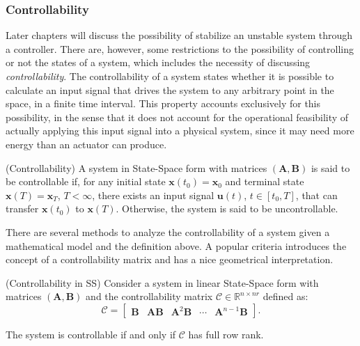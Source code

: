 \documentclass[a4paper,11pt]{book}
\numberwithin{figure}{chapter}
\numberwithin{equation}{chapter}
\numberwithin{table}{chapter}
\newtheorem{theorem}{Theorem}[chapter]
\theoremstyle{definition}
\newtheorem{definition}{Definition}[chapter]
\newcounter{boxed-theorem}
\newenvironment{boxed-theorem}[1]
{\colorlet{shadecolor}{pastelBlue2!10} \begin{shaded} \begin{theorem}{#1}}
{\end{theorem} \end{shaded}}
\newcounter{boxed-definition}
\newenvironment{boxed-definition}[1]
{\colorlet{shadecolor}{pastelYellow!15} \begin{shaded} \begin{definition}{#1}}
{\end{definition} \end{shaded}}
\newcounter{boxed-example}
\begin{document}
\subsubsection{Controllability}

Later chapters will discuss the possibility of stabilize an unstable system through a controller. There are, however, some restrictions to the possibility of controlling or not the states of a system, which includes the necessity of discussing \textit{controllability}. The controllability of a system states whether it is possible to calculate an input signal that drives the system to any arbitrary point in the space, in a finite time interval. This property accounts exclusively for this possibility, in the sense that it does not account for the operational feasibility of actually applying this input signal into a physical system, since it may need more energy than an actuator can produce. 

\begin{boxed-definition}{(Controllability)}
    A system in State-Space form with matrices $(\bm{A}, \bm{B})$ is said to be controllable if, for any initial state $\bm{x}(t_0) = \bm{x}_0$ and terminal state $\bm{x}(T) = \bm{x}_T$, $T < \infty$, there exists an input signal $\bm{u}(t)$, $t \in [t_0, T]$, that can transfer $\bm{x}(t_0)$ to $\bm{x}(T)$. Otherwise, the system is said to be uncontrollable. 
\end{boxed-definition}

There are several methods to analyze the controllability of a system given a mathematical model and the definition above. A popular criteria introduces the concept of a controllability matrix and has a nice geometrical interpretation.

\begin{boxed-theorem}{(Controllability in SS)}
    Consider a system in linear State-Space form with matrices $(\bm{A}, \bm{B})$ and the controllability matrix $\bm{\mathcal{C}} \in \mathbb{R}^{n \times nr}$ defined as:
    \begin{equation}
        \bm{\mathcal{C}} = \begin{bmatrix} \bm{B} & \bm{A} \bm{B} & \bm{A}^2 \bm{B} & \cdots & \bm{A}^{n-1} \bm{B} \end{bmatrix}
    .\end{equation}
    
    The system is controllable if and only if $\bm{\mathcal{C}}$ has full row rank.
\end{boxed-theorem}   
\end{document}

